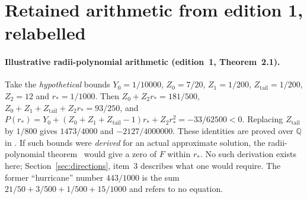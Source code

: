 \documentclass[11pt,a4paper]{article}
\theoremstyle{definition}
\newcommand{\lean}[1]{\path{#1}}
\begin{document}
\section{Retained arithmetic from edition 1, relabelled}
\label{sec:retained}
\paragraph{Illustrative radii-polynomial arithmetic (edition~1, Theorem~2.1).} Take the \emph{hypothetical} bounds $Y_0=1/10000$, $Z_0=7/20$, $Z_1=1/200$, $Z_{\mathrm{tail}}=1/200$, $Z_2=12$ and $r_*=1/1000$. Then $Z_0+Z_2r_*=181/500$, $Z_0+Z_1+Z_{\mathrm{tail}}+Z_2r_*=93/250$, and $P(r_*)=Y_0+(Z_0+Z_1+Z_{\mathrm{tail}}-1)r_*+Z_2r_*^2=-33/62500<0$. Replacing $Z_{\mathrm{tail}}$ by $1/800$ gives $1473/4000$ and $-2127/4000000$. These identities are proved over $\mathbb{Q}$ in \lean{P2_T1}. If such bounds were \emph{derived} for an actual approximate solution, the radii-polynomial theorem~\cite{DayLessard2007,Nakao2019} would give a zero of $F$ within $r_*$. No such derivation exists here; Section~\ref{sec:directions}, item~3 describes what one would require. The former ``hurricane'' number $443/1000$ is the sum $21/50+3/500+1/500+15/1000$ and refers to no equation.
\end{document}
